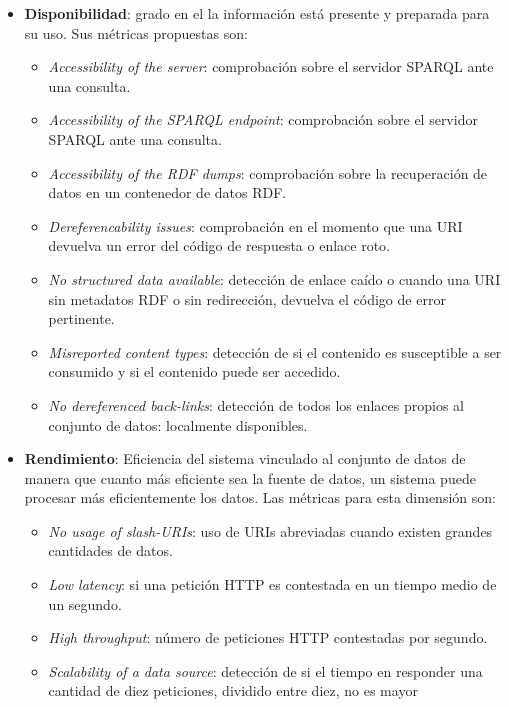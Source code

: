 \begin{itemize}
\item \textbf{Disponibilidad}: grado en el la información está presente y
  preparada para su uso. Sus métricas propuestas son: 
  \begin{itemize}
  \item \textit{Accessibility of the server}: comprobación sobre el servidor
    \acs{SPARQL} ante una consulta.
  \item \textit{Accessibility of the \acs{SPARQL} endpoint}:  comprobación sobre el servidor
    \acs{SPARQL} ante una consulta.
  \item \textit{Accessibility of the \acs{RDF} dumps}: comprobación sobre la
    recuperación de datos en un contenedor de datos \acs{RDF}.
  \item \textit{Dereferencability issues}: comprobación en el momento que una \acs{URI}
    devuelva un error del código de respuesta o enlace roto. 
  \item \textit{No structured data available}: detección de enlace caído o
    cuando una \acs{URI} sin metadatos \acs{RDF} o sin redirección, devuelva el
    código de error pertinente. 
  \item \textit{Misreported content types}: detección de si el contenido es
    susceptible a ser consumido y si el contenido puede ser accedido. 
  \item \textit{No dereferenced back-links}: detección de todos los enlaces
    propios al conjunto de datos: localmente disponibles. 
  \end{itemize}
\item \textbf{Rendimiento}: Eficiencia del sistema vinculado al conjunto de
  datos de manera que cuanto más eficiente sea la fuente de datos, un sistema
  puede procesar más eficientemente los datos. Las métricas para esta dimensión
  son: 
  \begin{itemize}
  \item \textit{No usage of slash-\acs{URI}s}: uso de \acs{URI}s abreviadas
    cuando existen grandes cantidades de datos. 
  \item \textit{Low latency}: si una petición \acs{HTTP}  es contestada en un
    tiempo medio de un segundo. 
  \item \textit{High throughput}: número de peticiones \acs{HTTP} contestadas
    por segundo. 
  \item \textit{Scalability of a data source}: detección de si el tiempo en
    responder una cantidad de diez peticiones, dividido entre diez, no es mayor

\end{itemize}
\end{itemize}
